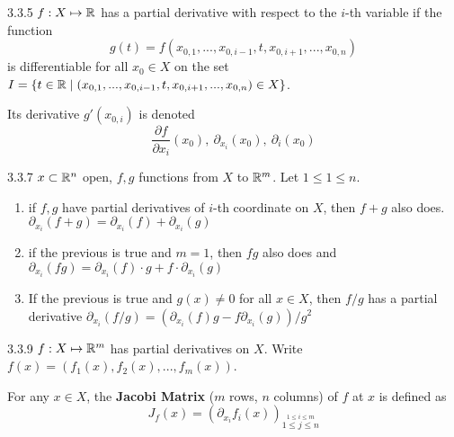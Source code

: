 
\begin{definition}{3.3.5}
    $f: X \mapsto \mathbb{R} $ has a partial derivative with respect to the $i$-th variable if the function
    \[ g(t) = f(x_{0,1}, ..., x_{0,i-1}, t, x_{0,i+1}, ..., x_{0,n}) \]
    is differentiable for all $x_0 \in X$ on the set $I = \left\{ t \in \mathbb{R} \mid (x_{0,1}, ..., x_{0,i-1}, t, x_{0,i+1}, ..., x_{0,n}) \in X \right\}$.

    Its derivative $g'(x_{0,i})$ is denoted
    \[ \frac{\partial f}{\partial x_i}(x_0),\ \partial_{x_i}(x_0),\ \partial_i (x_0) \]
\end{definition}

\begin{proposition}{3.3.7}
    $x \subset \mathbb{R}^n$ open, $f,g$ functions from $X$ to $\mathbb{R}^m$. Let $1 \le 1 \le n$.
    \begin{enumerate}
        \item if $f, g$ have partial derivatives of $i$-th coordinate on $X$, then $f + g$ also does.
              $\partial_{x_i}(f + g) = \partial_{x_i}(f) + \partial_{x_i}(g)$
        \item if the previous is true and $m = 1$, then $fg$ also does and $\partial_{x_i}(f g) = \partial_{x_i}(f) \cdot g + f \cdot \partial_{x_i}(g)$
        \item If the previous is true and $g(x) \ne 0$ for all $x \in X$, then $f / g$ has a partial derivative
              $\partial_{x_i}(f/g) = \left (\partial_{x_i}(f)g - f \partial_{x_i}(g) \right)/g^2$
    \end{enumerate}
\end{proposition}

\begin{definition}{3.3.9}
    $f: X \mapsto \mathbb{R}^m$ has partial derivatives on $X$. Write $f(x) = (f_1(x), f_2(x), ..., f_m(x))$.

    For any $x \in X$, the \textbf{Jacobi Matrix} ($m$ rows, $n$ columns) of $f$ at $x$ is defined as
    \[ J_f(x) = (\partial_{x_i} f_i(x))_{\stackrel{1 \le i \le m}{1 \le j \le n}} \]
\end{definition}

